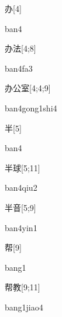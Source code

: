 \begin{verbete}[ban4]{办}[4]
\begin{pronuncia}{ban4}
\end{pronuncia}
\end{verbete}

\begin{verbete}[ban4fa3]{办法}[4;8]
\begin{pronuncia}{ban4fa3}
\end{pronuncia}
\end{verbete}

\begin{verbete}{办公室}[4;4;9]
\begin{pronuncia}{ban4gong1shi4}
\end{pronuncia}
\end{verbete}

\begin{verbete}[ban4]{半}[5]
\begin{pronuncia}{ban4}
\end{pronuncia}
\end{verbete}

\begin{verbete}{半球}[5;11]
\begin{pronuncia}{ban4qiu2}
\end{pronuncia}
\end{verbete}

\begin{verbete}{半音}[5;9]
\begin{pronuncia}{ban4yin1}
\end{pronuncia}
\end{verbete}

\begin{verbete}[bang1]{帮}[9]
\begin{pronuncia}{bang1}
\end{pronuncia}
\end{verbete}

\begin{verbete}{帮教}[9;11]
\begin{pronuncia}{bang1jiao4}
\end{pronuncia}
\end{verbete}

